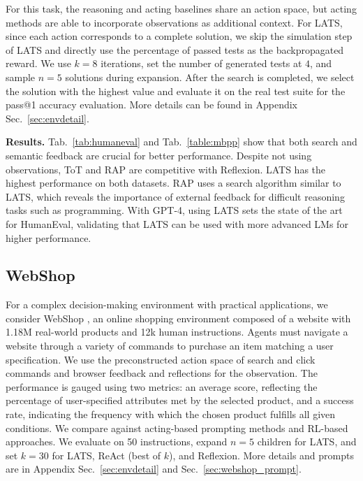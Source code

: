 \documentclass{article}
\theoremstyle{plain}
\theoremstyle{definition}
\theoremstyle{remark}
\begin{document}
For this task, the reasoning and acting baselines share an action space, but acting methods are able to incorporate observations as additional context. For LATS, since each action corresponds to a complete solution, we skip the simulation step of LATS and directly use the percentage of passed tests as the backpropagated reward. We use $k = 8$ iterations, set the number of generated tests at $4$, and sample $n = 5$ solutions during expansion. After the search is completed, we select the solution with the highest value and evaluate it on the real test suite for the pass@1 accuracy evaluation. More details can be found in Appendix Sec.~\ref{sec:envdetail}.

\textbf{Results.} Tab.~\ref{tab:humaneval} and Tab.~\ref{table:mbpp} show that both search and semantic feedback are crucial for better performance. Despite not using observations, ToT and RAP are competitive with Reflexion. LATS has the highest performance on both datasets. RAP uses a search algorithm similar to LATS, which reveals the importance of external feedback for difficult reasoning tasks such as programming. With GPT-4, using LATS sets the state of the art for HumanEval, validating that LATS can be used with more advanced LMs for higher performance.



\subsection{WebShop}

For a complex decision-making environment with practical applications, we consider WebShop \citep{yao2022webshop}, an online shopping environment composed of a website with 1.18M real-world products and 12k human instructions. Agents must navigate a website through a variety of commands to purchase an item matching a user specification. We use the preconstructed action space of search and click commands and browser feedback and reflections for the observation. The performance is gauged using two metrics: an average score, reflecting the percentage of user-specified attributes met by the selected product, and a success rate, indicating the frequency with which the chosen product fulfills all given conditions. We compare against acting-based prompting methods and RL-based approaches. We evaluate on 50 instructions, expand $n=5$ children for LATS, and set $k=30$ for LATS, ReAct (best of $k$), and Reflexion. More details and prompts are in Appendix Sec.~\ref{sec:envdetail} and Sec.~\ref{sec:webshop_prompt}.
\end{document}
